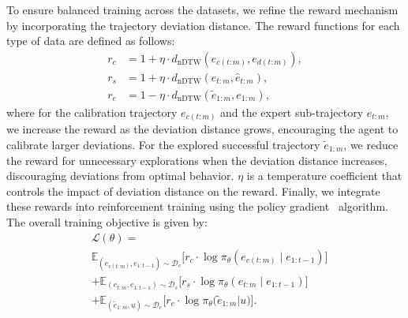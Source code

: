 To ensure balanced training across the datasets, we refine the reward mechanism by incorporating the trajectory deviation distance.
The reward functions for each type of data are defined as follows:
\begin{align}
 r_c &= 1+\eta \cdot d_{\text{nDTW}}(e_{c(t:m)}, {e}_{d(t:m)}), \\
 r_{s} &= 1+\eta \cdot d_{\text{nDTW}}(e_{t:m}, \hat{e}_{t:m}),  \\
  r_{e} &= 1-\eta \cdot d_{\text{nDTW}}(\tilde{e}_{1:m}, e_{1:m}), 
\end{align}
where for the calibration trajectory $e_{c(t:m)}$ and the expert sub-trajectory $e_{t:m}$, we increase the reward as the deviation distance grows, encouraging the agent to calibrate larger deviations.
For the explored successful trajectory $\tilde{e}_{1:m}$, we reduce the reward for unnecessary explorations when the deviation distance increases, discouraging deviations from optimal behavior.
$\eta$ is a temperature coefficient that controls the impact of deviation distance on the reward.
Finally, we integrate these rewards into reinforcement training using the policy gradient~\citep{peters2007reinforcement} algorithm. The overall training objective is given by:
\begin{align}
& \mathcal{L}(\theta) = \nonumber \\
& \mathbb{E}_{(e_{c(t:m)}, e_{1:t-1}) \sim \mathcal{D}_c}
\Big[
    r_c \cdot \log \pi_\theta(e_{c(t:m)} \mid e_{1:t-1})
\Big] \nonumber \\
& + \mathbb{E}_{(e_{t:m}, e_{1:t-1}) \sim \mathcal{D}_{s}}
\Big[
    r_{s} \cdot \log \pi_\theta(e_{t:m} \mid e_{1:t-1})
\Big] \\
& + \mathbb{E}_{(\tilde{e}_{1:m}, u) \sim \mathcal{D}_{e}}
\Big[
    r_{e} \cdot \log \pi_\theta\big(\tilde{e}_{1:m} \big| u\big)
\Big] \nonumber.
\end{align}
